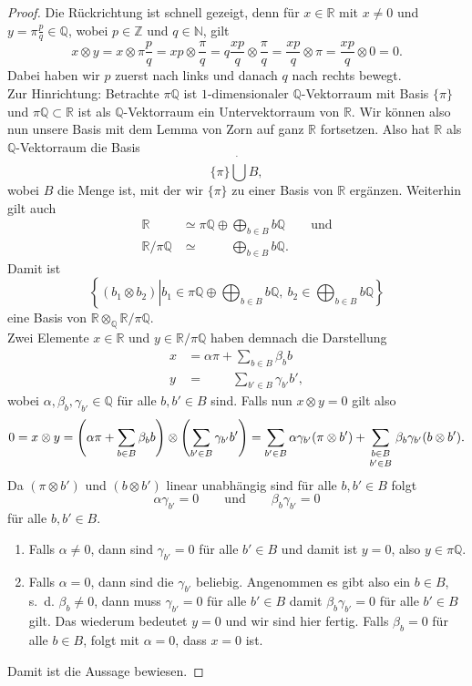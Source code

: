 \documentclass[11pt,titlepage]{article}
\newcommand{\setN}{\mathbb{N}}
\newcommand{\setZ}{\mathbb{Z}}
\newcommand{\setQ}{\mathbb{Q}}
\newcommand{\setR}{\mathbb{R}}
\theoremstyle{definition}
\theoremstyle{remark}
\begin{document}
	\begin{proof}
		Die Rückrichtung ist schnell gezeigt, 
		denn für $x\in\setR$ mit $x\neq 0$ und $y=\pi\frac{p}{q}\in\setQ$, wobei $p\in\setZ$ und $q\in\setN$, gilt
		\[ x\otimes y =x\otimes\pi \frac{p}{q} =xp\otimes\frac{\pi}{q} =q\frac{xp}{q}
		\otimes\frac{\pi}{q} = \frac{xp}{q}\otimes\pi =\frac{xp}{q}\otimes 0=0.\]
		Dabei haben wir $p$ zuerst nach links und danach $q$ nach rechts bewegt. \\
		Zur Hinrichtung: Betrachte $\pi\setQ$ ist $1$-dimensionaler 
		$\setQ$-Vektorraum mit Basis $\{\pi\}$ und $\pi\setQ\subset\setR$ ist 
		als $\setQ$-Vektorraum ein 
		Untervektorraum von $\setR$. Wir können also nun 
		unsere Basis mit dem Lemma von Zorn auf ganz $\setR$ fortsetzen. 
		Also hat $\setR$ als $\setQ$-Vektorraum die Basis
		\[\{\pi\}\dot\bigcup B,\]
		wobei $B$ die Menge ist, mit der wir $\{\pi\}$ zu einer Basis von $\setR$ 
		ergänzen. Weiterhin gilt auch
		\begin{align*}
			\setR&\simeq\pi\setQ\oplus\bigoplus_{b\in B}b\setQ\qquad\text{und}\\
			\setR /\pi\setQ&\simeq\qquad\ \ \bigoplus_{b\in B}b\setQ.
		\end{align*}
		Damit ist
		\[\left\{(b_1\otimes b_2)\left\vert b_1\in\pi\setQ\oplus\bigoplus_{b\in B}b\setQ,\ b_2\in \bigoplus_{b\in B}b\setQ\right\}\right.\]
		eine Basis von $\setR\otimes_\setQ\setR/\pi\setQ$. \\
		Zwei Elemente $x\in\setR$ und $y\in\setR/\pi\setQ$ haben demnach die 
		Darstellung
		\begin{align*}
			x&=\alpha\pi+\sum_{b\in B}\beta_b b \\
			y&= \qquad\ \sum_{b'\in B}\gamma_{b'}b',
		\end{align*}
		wobei $\alpha,\beta_b,\gamma_{b'}\in\setQ$ für alle $b,b'\in B$ sind. 
		Falls nun $x\otimes y=0$ gilt also
		\[0=x\otimes y=\left(\alpha\pi+\sum_{b\in B}\beta_b b\right)\otimes
		\left(\sum_{b'\in B}\gamma_{b'}b'\right)=\sum_{b'\in 
		B}\alpha\gamma_{b'}(\pi\otimes b')+\sum_{\genfrac{}{}{0pt}{1}{b\in B}
		{b'\in B}} \beta_b\gamma_{b'}(b\otimes b').\]
		Da $(\pi\otimes b')$ und $(b\otimes b')$ linear unabhängig sind für alle  
		$b,b'\in B$ folgt
		\[\alpha\gamma_{b'}=0\qquad\text{und}\qquad \beta_b\gamma_{b'}=0\]
		für alle $b,b'\in B$. 
		\begin{enumerate}
			\item Falls $\alpha\neq 0$, dann sind $\gamma_{b'}=0$ für alle 
			$b'\in B$ und damit ist $y=0$, also $y\in \pi\setQ$.
			\item Falls $\alpha=0$, dann sind die $\gamma_{b'}$ beliebig. 
			Angenommen es gibt also ein $b\in B$, s.~d. $\beta_b \neq 0$, dann 
			muss $\gamma_{b'}=0$ für alle $b'\in B$ damit $\beta_b\gamma_{b'}=0$ 
			für alle $b'\in B$ gilt. Das wiederum bedeutet $y=0$ und wir sind hier 
			fertig. Falls $\beta_b=0$ für alle $b\in B$, folgt mit $\alpha=0$, 
			dass $x=0$ ist.
		\end{enumerate}
		Damit ist die Aussage bewiesen.
	\end{proof}
\end{document}
